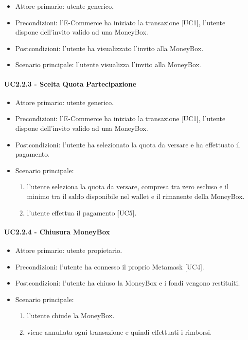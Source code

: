 \begin{itemize}
    \item Attore primario: utente generico.
    \item Precondizioni: l'E-Commerce ha iniziato la transazione [UC1], l'utente dispone dell'invito valido ad una MoneyBox.
    \item Postcondizioni: l'utente ha visualizzato l'invito alla MoneyBox.
    \item Scenario principale: l'utente visualizza l'invito alla MoneyBox.
\end{itemize}

\paragraph{UC2.2.3 - Scelta Quota Partecipazione}

\begin{itemize}
    \item Attore primario: utente generico.
    \item Precondizioni: l'E-Commerce ha iniziato la transazione [UC1], l'utente dispone dell'invito valido ad una MoneyBox.
    \item Postcondizioni: l'utente ha selezionato la quota da versare e ha effettuato il pagamento.
    \item Scenario principale:\begin{enumerate}
        \item l'utente seleziona la quota da versare, compresa tra zero escluso e il minimo tra il saldo disponibile nel wallet e il rimanente della MoneyBox.
        \item l'utente effettua il pagamento [UC5].
    \end{enumerate}
\end{itemize}

\paragraph{UC2.2.4 - Chiusura MoneyBox}

\begin{itemize}
    \item Attore primario: utente propietario.
    \item Precondizioni: l'utente ha connesso il proprio Metamask [UC4].
    \item Postcondizioni: l'utente ha chiuso la MoneyBox e i fondi vengono restituiti.
    \item Scenario principale: \begin{enumerate}
        \item l'utente chiude la MoneyBox.
        \item viene annullata ogni transazione e quindi effettuati i rimborsi.
    \end{enumerate}
\end{itemize}

